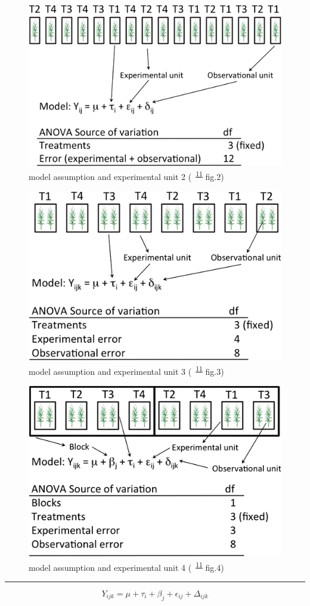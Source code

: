 \documentclass[
]{book}
\theoremstyle{definition}
\theoremstyle{definition}
\theoremstyle{definition}
\theoremstyle{definition}
\theoremstyle{remark}
\begin{document}
\begin{figure}
\includegraphics[width=0.5\linewidth]{img/casler2015-fig2} \caption{model assumption and experimental unit 2 (~\textsuperscript{\protect\hyperlink{ref-casler2015}{11}} fig.2)}\label{fig:unnamed-chunk-4}
\end{figure}

\begin{figure}
\includegraphics[width=0.5\linewidth]{img/casler2015-fig3} \caption{model assumption and experimental unit 3 (~\textsuperscript{\protect\hyperlink{ref-casler2015}{11}} fig.3)}\label{fig:unnamed-chunk-5}
\end{figure}

\begin{figure}
\includegraphics[width=0.5\linewidth]{img/casler2015-fig4} \caption{model assumption and experimental unit 4 (~\textsuperscript{\protect\hyperlink{ref-casler2015}{11}} fig.4)}\label{fig:unnamed-chunk-6}
\end{figure}

\begin{center}\rule{0.5\linewidth}{0.5pt}\end{center}

\[
Y_{{\scriptscriptstyle ijk}}=\mu+\tau_{{\scriptscriptstyle i}}+\beta_{{\scriptscriptstyle j}}+\epsilon_{{\scriptscriptstyle ij}}+\varDelta_{{\scriptscriptstyle ijk}}
\]
\end{document}
